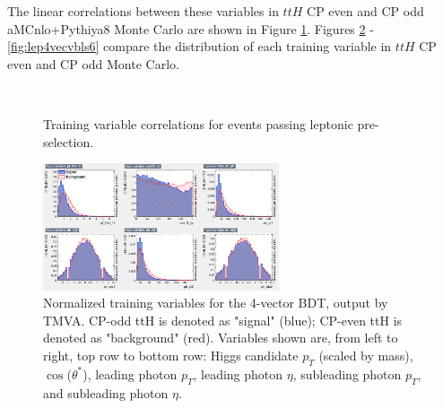 The linear correlations between these variables in $ttH$ CP even and CP odd aMCnlo+Pythiya8 Monte Carlo are shown in Figure \ref{fig:lepcorr4vec}.  Figures \ref{fig:lep4vecvbls1} - \ref{fig:lep4vecvbls6} compare the distribution of each training variable in $ttH$ CP even and CP odd Monte Carlo.

\begin{figure}[htbp]
  \centering
    \\
 \caption{Training variable correlations for events passing leptonic pre-selection.}
  \label{fig:lepcorr4vec}
\end{figure}

\begin{figure}[htbp]
  \centering
  \includegraphics[width=0.62\textwidth]{figures/TMVABDTStudies/lep-vbls4vec/lep4vecvbls1.png}
  \caption{Normalized training variables for the 4-vector BDT, output by TMVA. CP-odd ttH is denoted as "signal" (blue); CP-even ttH is denoted as "background" (red). Variables shown are, from left to right, top row to bottom row: Higgs candidate $p_{T}$ (scaled by mass), $\cos$($\theta^{*}$), leading photon $p_{T}$, leading photon $\eta$, subleading photon $p_{T}$, and subleading photon $\eta$.}
  \label{fig:lep4vecvbls1}
\end{figure}

